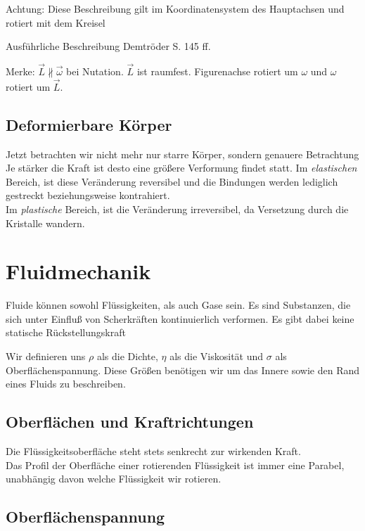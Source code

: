 \documentclass[a4paper,12pt]{report}
\begin{document}
Achtung: Diese Beschreibung gilt im Koordinatensystem des Hauptachsen und rotiert mit dem Kreisel


Ausführliche Beschreibung Demtröder S. 145 ff.

Merke: $\vec{L} \nparallel \vec{\omega} $  bei Nutation. $\vec{L}$ ist raumfest. Figurenachse rotiert um $\omega$
und $ \omega $ rotiert um $\vec{L}$.


\subsection{Deformierbare Körper}

Jetzt betrachten wir nicht mehr nur starre Körper, sondern genauere Betrachtung \\

Je stärker die Kraft ist desto eine größere Verformung findet statt. Im \emph{elastischen} Bereich, ist diese Veränderung reversibel und die Bindungen werden lediglich gestreckt beziehungsweise kontrahiert.\\
 Im \emph{plastische} Bereich, ist die Veränderung irreversibel, da Versetzung durch die Kristalle wandern.







\section{Fluidmechanik}

Fluide können sowohl Flüssigkeiten, als auch Gase sein. Es sind Substanzen, die sich unter Einfluß von Scherkräften kontinuierlich  verformen. Es gibt dabei keine statische Rückstellungskraft 

Wir definieren uns $\rho$ als die Dichte, $\eta$ als die Viskosität und $\sigma$ als Oberflächenspannung. Diese Größen benötigen wir um das Innere sowie den Rand eines Fluids zu beschreiben.


\subsection{Oberflächen und Kraftrichtungen}
Die Flüssigkeitsoberfläche steht stets senkrecht zur wirkenden Kraft. \\
Das Profil der Oberfläche einer rotierenden Flüssigkeit ist immer eine Parabel, unabhängig davon welche Flüssigkeit wir rotieren.

\subsection{Oberflächenspannung}
\end{document}
